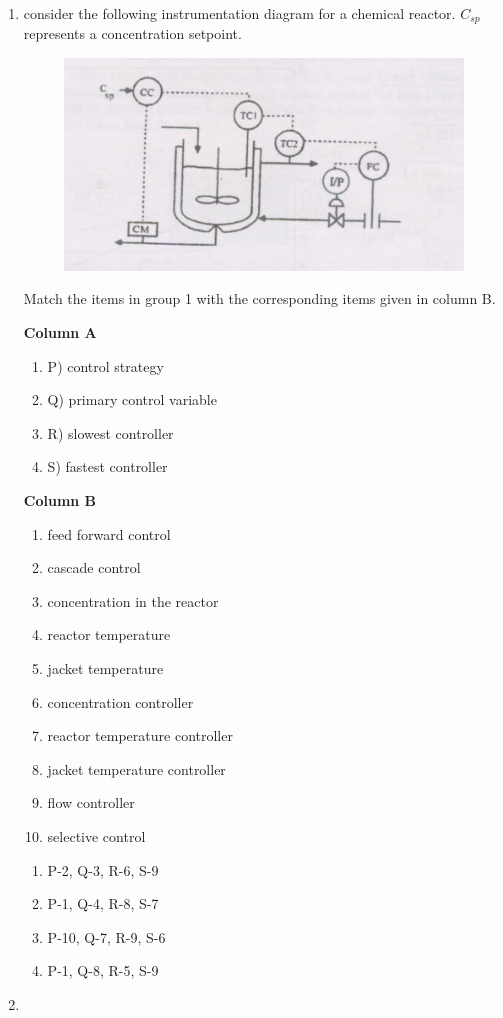 \documentclass[journal,12pt,onecolumn]{IEEEtran}
\theoremstyle{remark}
\begin{document}
\begin{enumerate}
    \item consider the following instrumentation diagram for a chemical reactor.  $C_{sp}$ represents a concentration setpoint.

    \begin{figure}[H]
        \centering
        \includegraphics[width=0.5\columnwidth]{figs/62.png}
        \caption{}
        \label{fig:62}
    \end{figure}
Match the items in group 1 with the corresponding items given in column B.

\begin{multicols}{2}
\textbf{Column A}
\begin{enumerate}
    \item P) control strategy
    \item Q) primary control variable
    \item R) slowest controller
    \item S) fastest controller
\end{enumerate}

\columnbreak

\textbf{Column B}
\begin{enumerate}
    \item feed forward control
    \item cascade control
    \item concentration in the reactor
    \item reactor temperature
    \item jacket temperature
    \item concentration controller
    \item reactor temperature controller
    \item jacket temperature controller
    \item flow controller
    \item selective control
\end{enumerate}
\end{multicols}

\begin{multicols}{2}
\begin{enumerate}
    \item P-2, Q-3, R-6, S-9
    \item P-1, Q-4, R-8, S-7
    \item P-10, Q-7, R-9, S-6
    \item P-1, Q-8, R-5, S-9
\end{enumerate}
\end{multicols}
    \item 


\end{enumerate}
\end{document}
